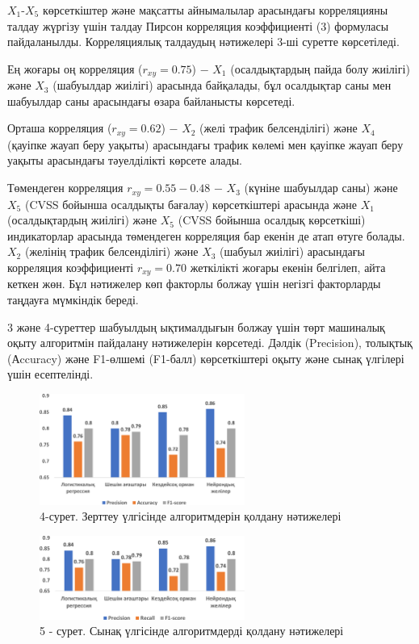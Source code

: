 \begin{multicols}{2}
\(X_{1}\)-\(X_{5}\) көрсеткіштер және мақсатты айнымалылар арасындағы
корреляцияны талдау жүргізу үшін талдау Пирсон корреляция коэффициенті
(3) формуласы пайдаланылды. Корреляциялық талдаудың нәтижелері 3-ші
суретте көрсетіледі.

Ең жоғары оң корреляция (\(r_{xy} = 0.75\)) − \(X_{1}\) (осалдықтардың
пайда болу жиілігі) және \(X_{3}\) (шабуылдар жиілігі) арасында
байқалады, бұл осалдықтар саны мен шабуылдар саны арасындағы өзара
байланысты көрсетеді.

Орташа корреляция (\(r_{xy} = 0.62\)) − \(X_{2}\) (желі трафик
белсенділігі) және \(X_{4}\) (қауіпке жауап беру уақыты) арасындағы
трафик көлемі мен қауіпке жауап беру уақыты арасындағы тәуелділікті
көрсете алады.

Төмендеген корреляция \(r_{xy} = 0.55 - 0.48\) − \(X_{3}\) (күніне
шабуылдар саны) және \(X_{5}\) (CVSS бойынша осалдықты бағалау)
көрсеткіштері арасында және \(X_{1}\) (осалдықтардың жиілігі) және
\(X_{5}\) (CVSS бойынша осалдық көрсеткіші) индикаторлар арасында
төмендеген корреляция бар екенін де атап өтуге болады. \(X_{2}\)
(желінің трафик белсенділігі) және \(X_{3}\) (шабуыл жиілігі) арасындағы
корреляция коэффициенті \(r_{xy} = 0.70\) жеткілікті жоғары екенін
белгілеп, айта кеткен жөн. Бұл нәтижелер көп факторлы болжау үшін
негізгі факторларды таңдауға мүмкіндік береді.

3 және 4-суреттер шабуылдың ықтималдығын болжау үшін төрт машиналық
оқыту алгоритмін пайдалану нәтижелерін көрсетеді. Дәлдік (Precision),
толықтық (Аccuracy) және F1-өлшемі (F1-балл) көрсеткіштері оқыту және
сынақ үлгілері үшін есептелінді.
\end{multicols}

\begin{figure}[H]
	\centering
	\includegraphics[width=0.6\textwidth]{media/ict/Graph_5}
	\caption*{4-сурет. Зерттеу үлгісінде алгоритмдерін қолдану нәтижелері}
\end{figure}

\begin{figure}[H]
	\centering
	\includegraphics[width=0.6\textwidth]{media/ict/Graph_6}
	\caption*{5 - сурет. Сынақ үлгісінде алгоритмдерді қолдану нәтижелері}
\end{figure}

